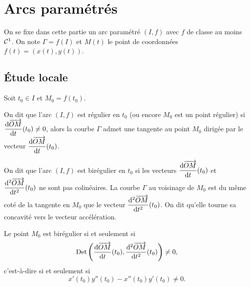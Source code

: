 \section{Arcs paramétrés}

On se fixe dans cette partie un arc paramétré \((I, f)\) avec \(f\) de classe au
moins \(\mathcal{C}^{1}\). On note \(\Gamma = f(I)\) et \(M(t)\) le point de
coordonnées \(f(t) = (x(t), y(t))\).

\subsection{Étude locale}

Soit \(t_0 \in I\) et \(M_0 = f(t_0)\).
\begin{defdef}
  On dit que l'arc \((I, f)\) est régulier en \(t_0\) (ou encore \(M_0\) est un
  point régulier) si \(\dfrac{\mathrm{d} \overrightarrow{OM}}{\mathrm{d} t}(t_0) \neq 0\), alors la courbe
  \(\Gamma\) admet une tangente au point \(M_0\) dirigée par le vecteur
  \(\dfrac{\mathrm{d} \overrightarrow{OM}}{\mathrm{d} t}(t_0)\).%
\end{defdef}

\begin{defdef}
  On dit que l'arc \((I, f)\) est birégulier en \(t_0\) si les vecteurs
  \(\dfrac{\mathrm{d} \overrightarrow{OM}}{\mathrm{d} t}(t_0)\) et \(\dfrac{\mathrm{d}^2 \overrightarrow{OM}}{\mathrm{d} {t}^2}(t_0)\) ne sont
  pas colinéaires. La courbe \(\Gamma\) au voisinage de \(M_0\) est du même coté
  de la tangente en \(M_0\) que le vecteur \(\dfrac{\mathrm{d}^2 \overrightarrow{OM}}{\mathrm{d} {t}^2}(t_0)\). On
  dit qu'elle \og tourne sa concavité\fg{} vers le vecteur accélération.
\end{defdef}

\begin{prop}
  Le point \(M_0\) est birégulier si et seulement si
  \begin{equation}
    \operatorname{Det}\left(\dfrac{\mathrm{d} \overrightarrow{OM}}{\mathrm{d} t}(t_0),\dfrac{\mathrm{d}^2 \overrightarrow{OM}}{\mathrm{d} {t}^2}(t_0)\right)
    \neq 0,
  \end{equation}
  c'est-à-dire si et seulement si
  \begin{equation}
    x'(t_0)y''(t_0) - x''(t_0)y'(t_0) \neq 0.
  \end{equation}
\end{prop}

